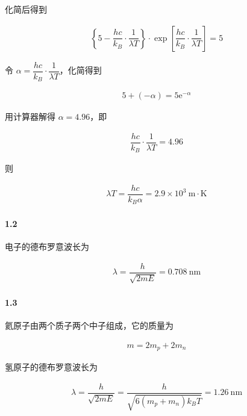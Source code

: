 \documentclass{article}
\newcommand*{\me}{\mathrm{e}}
\newcommand{\si}[1]{\  \mathrm{#1}}
\begin{document}
化简后得到

\begin{equation*}
  \begin{aligned}
    \left\{ 5 - \dfrac{hc}{k_B} \cdot \dfrac{1}{\lambda T}   \right\} \cdot \exp \left[ \dfrac{hc}{k_B} \cdot \dfrac{1}{\lambda T}   \right] = 5
  \end{aligned}
\end{equation*}

令 $\alpha = \dfrac{hc}{k_B} \cdot \dfrac{1}{\lambda T}  $，化简得到

\begin{equation*}
  \begin{aligned}
    5 + \left( - \alpha \right) = 5 \me^{-\alpha}
  \end{aligned}
\end{equation*}

用计算器解得 $\alpha = 4.96$，即

\begin{equation*}
  \begin{aligned}
    \dfrac{hc}{k_B} \cdot \dfrac{1}{\lambda T} = 4.96  
  \end{aligned}
\end{equation*}

则

\begin{equation*}
  \begin{aligned}
    \lambda T = \dfrac{h c}{k_B \alpha} = 2.9 \times 10^3 \si{m \cdot K} 
  \end{aligned}
\end{equation*}

\paragraph{1.2}

电子的德布罗意波长为

\begin{equation*}
  \begin{aligned}
    \lambda = \dfrac{h}{\sqrt{2 m E}} = 0.708 \si{nm} 
  \end{aligned}
\end{equation*}

\paragraph{1.3}

氦原子由两个质子两个中子组成，它的质量为

\begin{equation*}
  \begin{aligned}
    m = 2 m_p + 2 m_n
  \end{aligned}
\end{equation*}

氢原子的德布罗意波长为

\begin{equation*}
  \begin{aligned}
    \lambda = \dfrac{h}{\sqrt{2 m E}} = \dfrac{h}{\sqrt{6 \left( m_p + m_n \right) k_B T}} = 1.26 \si{nm}  
  \end{aligned}
\end{equation*}
\end{document}

